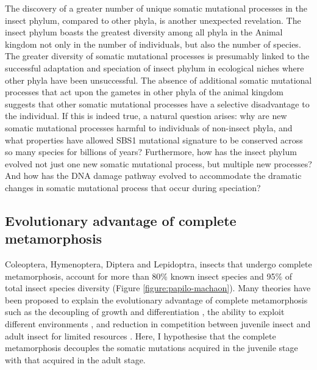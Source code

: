 The discovery of a greater number of unique somatic mutational processes in the insect phylum, compared to other phyla, is another unexpected revelation. The insect phylum boasts the greatest diversity among all phyla in the Animal kingdom not only in the number of individuals, but also the number of species. The greater diversity of somatic mutational processes is presumably linked to the successful adaptation and speciation of insect phylum in ecological niches where other phyla have been unsuccessful. The absence of additional somatic mutational processes that act upon the gametes in other phyla of the animal kingdom suggests that other somatic mutational processes have a selective disadvantage to the individual. If this is indeed true, a natural question arises: why are new somatic mutational processes harmful to individuals of non-insect phyla, and what properties have allowed SBS1 mutational signature to be conserved across so many species for billions of years? Furthermore, how has the insect phylum evolved not just one new somatic mutational process, but multiple new processes? And how has the DNA damage pathway evolved to accommodate the dramatic changes in somatic mutational process that occur during speciation? 

\subsection{Evolutionary advantage of complete metamorphosis}

Coleoptera, Hymenoptera, Diptera and Lepidoptra, insects that undergo complete metamorphosis, account for more than 80\% known insect species and 95\% of total insect species diversity (Figure \ref{figure:papilo-machaon}). Many theories have been proposed to explain the evolutionary advantage of complete metamorphosis such as the decoupling of growth and differentiation \cite{Rolff2019-ef}, the ability to exploit different environments \cite{Darwin1859}, and reduction in competition between juvenile insect and adult insect for limited resources \cite{Ebenman1992-in}. Here, I hypothesise that the complete metamorphosis decouples the somatic mutations acquired in the juvenile stage with that acquired in the adult stage. 

